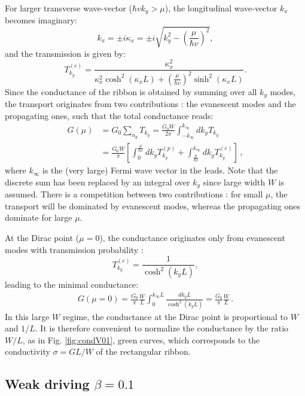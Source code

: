 \documentclass[aps,prb,showpacs,superscriptaddress,twocolumn,10pt,floatfix]{revtex4-1}
\begin{document}
For larger transverse wave-vector ($\hbar vk_y > \mu$), the longitudinal wave-vector $k_x$ becomes imaginary:
\begin{equation}
k_x=\pm i \kappa_x = \pm i \sqrt{k_y^2 - \left(\frac{\mu}{\hbar v}\right)^2},
\end{equation}
and the transmission is given by:
\begin{equation}
T^{(e)}_{k_y}=\frac{\kappa_x^2}{\kappa_x^2\cosh^2(\kappa_xL)+\left(\frac{\mu}{\hbar v}\right)^2\sinh^2(\kappa_xL)}.
\end{equation}
Since the conductance of the ribbon is obtained by summing over all $k_y$ modes, the transport originates from two contributions : the evanescent modes and the propagating ones, such that the total conductance reads:
\begin{align}
G(\mu)&=G_0\sum_{n_y}T_{k_y}=\frac{G_0W}{2\pi}\int_{-k_\infty}^{k_\infty}dk_yT_{k_y} \\
&=\frac{G_0W}{\pi}\left[\int_0^{\frac{\mu}{\hbar v}}dk_yT^{(p)}_{k_y}+\int_{\frac{\mu}{\hbar v}}^{k_\infty}dk_yT^{(e)}_{k_y}\right] \, ,
\end{align}
where $k_\infty$ is the (very large) Fermi wave vector in the leads. Note that the discrete sum has been replaced by an integral over $k_y$ since large width $W$ is assumed. There is a competition between two contributions : for small $\mu$, the transport will be dominated by evanescent modes, whereas the propagating ones dominate for large $\mu$.


At the Dirac point ($\mu=0$), the conductance originates only from evanescent modes with transmission probability :
\begin{equation}
T^{(e)}_{k_y}=\frac{1}{\cosh^2(k_{y}L)},
\label{eq:trans_evan}
\end{equation}
leading to the minimal conductance:
\begin{align}
G(\mu=0)=\frac{G_0}{\pi}\frac{W}{L}\int^{k_\infty L}_{0}\frac{dk_yL}{\cosh^2(k_yL)}=\frac{G_0}{\pi}\frac{W}{L} \, .
\label{eq:non_irrad}
\end{align}
In this large $W$ regime, the conductance at the Dirac point is proportional to $W$ and $1/L$. It is therefore convenient to normalize the conductance by the ratio $W/L$, as in Fig. \ref{fig:condV01}, green curves, which corresponds to the conductivity $\sigma = GL/W$ of the rectangular ribbon. 

\subsection{Weak driving $\beta=0.1$}
\end{document}
